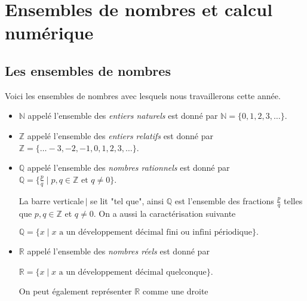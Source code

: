 \documentclass[a4paper,12pt]{report}
\begin{document}
\chapter{Ensembles de nombres et calcul numérique}
\thispagestyle{fancy}
\section{Les ensembles de nombres}
Voici les ensembles de nombres avec lesquels nous travaillerons cette année. 
\begin{itemize}
	\item $\mathbb{N}$ appelé l'ensemble des \emph{entiers naturels} est donné par $\mathbb{N}=\{0,1,2,3,\ldots\}$.
	\item $\mathbb{Z}$ appelé l'ensemble des \emph{entiers relatifs} est donné par $\mathbb{Z}=\{\ldots -3,-2,-1,0,1,2,3,\ldots\}$.
	\item $\mathbb{Q}$ appelé l'ensemble des \emph{nombres rationnels} est donné par $\mathbb{Q}=\{\frac{p}{q} \mid p,q\in \mathbb{Z} \text{ et } q\neq 0 \}$. 
	
	La barre verticale\,$\mid$ se lit "tel que", ainsi $\mathbb{Q}$ est l'ensemble des fractions $\frac{p}{q}$ telles que $p,q \in \mathbb Z$ et $q\neq 0$. On a aussi la caractérisation suivante 

	$\mathbb Q=\{x \mid x \text{ a un développement décimal fini ou infini périodique}\}.$
\item $\mathbb{R}$ appelé l'ensemble des \emph{nombres réels} est donné par 

	$\mathbb R=\{x \mid x \text{ a un développement décimal quelconque}\}$.

	On peut également représenter $\mathbb{R}$ comme une droite 
	\begin{center}
\end{center}
\end{itemize}
\end{document}
